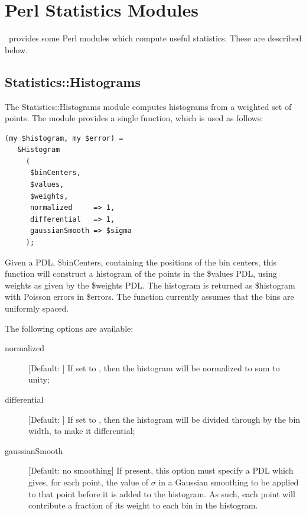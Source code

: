 \section{Perl Statistics Modules}

\glc\ provides some Perl modules which compute useful statistics. These are described below.

\subsection{{\normalfont \ttfamily Statistics::Histograms}}

The {\normalfont \ttfamily Statistics::Histograms} module computes histograms from a weighted set of points. The module provides a single function, which is used as follows:
\begin{verbatim}
(my $histogram, my $error) = 
   &Histogram
     (
      $binCenters,
      $values,
      $weights,
      normalized     => 1,
      differential   => 1,
      gaussianSmooth => $sigma
     );
\end{verbatim}
Given a PDL, {\normalfont \ttfamily \$binCenters}, containing the positions of the bin centers, this function will construct a histogram of the points in the {\normalfont \ttfamily \$values} PDL, using weights as given by the {\normalfont \ttfamily \$weights} PDL. The histogram is returned as {\normalfont \ttfamily \$histogram} with Poisson errors in {\normalfont \ttfamily \$errors}. The function currently assumes that the bins are uniformly spaced.

The following options are available:
\begin{description}
 \item [{\normalfont \ttfamily normalized}] [Default: {\normalfont {}}] If set to {\normalfont {}}, then the histogram will be normalized to sum to unity;
 \item [{\normalfont \ttfamily differential}] [Default: {\normalfont {}}] If set to {\normalfont {}}, then the histogram will be divided through by the bin width, to make it differential;
 \item[{\normalfont \ttfamily gaussianSmooth}] [Default: no smoothing] If present, this option must specify a PDL which gives, for each point, the value of $\sigma$ in a Gaussian smoothing to be applied to that point before it is added to the histogram. As such, each point will contribute a fraction of its weight to each bin in the histogram.
\end{description}

